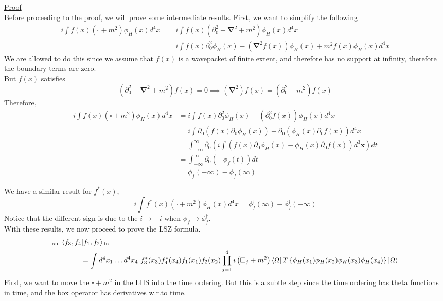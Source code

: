 \documentclass[11pt]{article}
\newcommand{\del}{\partial}
\numberwithin{equation}{section}
\begin{document}
\underline{Proof}—\\
Before proceeding to the proof, we will prove some intermediate results. First, we want to simplify the following
\begin{align*}
    i\int f(x) (\square + m^2) \phi_H(x) d^4x &= i\int f(x) \left(\del_0^2 - \mathbf{\nabla}^2 + m^2\right)\phi_H(x) d^4x\\
    &=i\int f(x) \del_0^2\phi_H(x) - \left(\mathbf{\nabla}^2 f(x)\right) \phi_H(x) + m^2f(x)\phi_H(x)d^4x
\end{align*}
We are allowed to do this since we assume that \(f(x)\) is a wavepacket of finite extent, and therefore has no support at infinity, therefore the boundary terms are zero.\\
But \(f(x)\) satisfies
\begin{equation*}
    \left(\del_0^2 - \mathbf{\nabla}^2 +m^2\right)f(x) = 0 \implies \left(\mathbf{\nabla}^2 \right)f(x) = (\del_0^2 + m^2)f(x)
\end{equation*}
Therefore, 
\begin{align*}
    i\int f(x) (\square + m^2) \phi_H(x) d^4x &= i\int f(x) \del_0^2\phi_H(x) - \left(\del_0^2 f(x)\right) \phi_H(x)d^4x\\
    &=i\int \del_0\left(f(x) \del_0\phi_H(x)\right) - \del_0\left(\phi_H(x)\del_0 f(x)\right) d^4x\\
    &=\int_{-\infty}^{\infty}\del_0\left(i\int \left(f(x) \del_0\phi_H(x)- \phi_H(x)\del_0 f(x)\right) d^3\textbf{x}\right)dt\\
    &= \int_{-\infty}^{\infty} \del_0\left(- \phi_f(t)\right) dt\\
    &= \phi_f(-\infty) - \phi_f(\infty)
\end{align*}

We have a similar result for \(f^*(x)\),
\begin{equation*}
    i\int f^*(x) (\square + m^2) \phi_H(x) d^4x = \phi_f^\dagger(\infty) - \phi_f^\dagger(-\infty)
\end{equation*}
Notice that the different sign is due to the \(i\to -i\) when \(\phi_f\to \phi^\dagger_f\).\\

With these results, we now proceed to prove the LSZ formula. 
\begin{align*}
    &{}_{\text{out}}\braket{f_3, f_4|f_1, f_2}{}_{\text{in}} \\
    &~~~~~~~~~~~~= \int d^4x_1 \ldots d^4x_4 ~f_3^*(x_3)f_4^*(x_4)f_1(x_1)f_2(x_2) \prod_{j=1}^4i\left(\square_j + m^2 \right) \bra{\Omega}T\left\{ \phi_H(x_1)\phi_H(x_2)\phi_H(x_3)\phi_H(x_4) \right\}\ket{\Omega}
\end{align*}
First, we want to move the \(\square + m^2\) in the LHS into the time ordering. But this is a subtle step since the time ordering has theta functions in time, and the box operator has derivatives w.r.to time.\\
\end{document}
